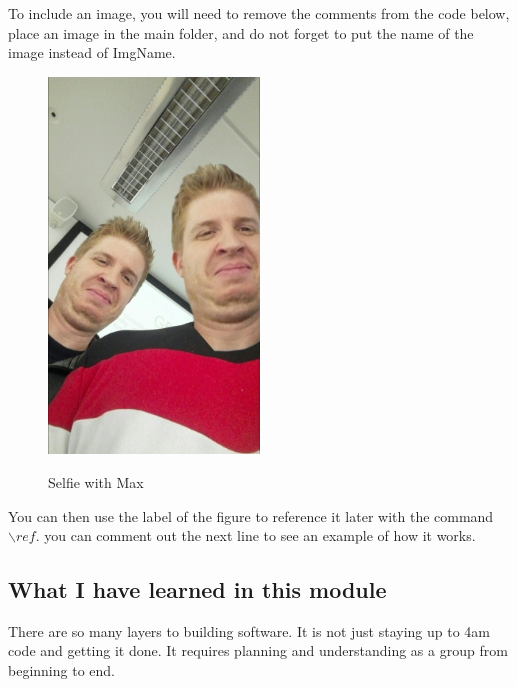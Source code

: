 To include an image, you will need to remove the comments from the code below, place an image in the main folder, and do not forget to put the name of the image instead of ImgName. 

\begin{figure}[h]
\caption{Selfie with Max}
\centering
\includegraphics[width=0.5\textwidth]{af48bcf9-8756-467e-bd54-b3275c9d5df9.jpg}
\label{fig:selfie}
\end{figure}

You can then use the label of the figure to reference it later with the command ${\backslash}ref$. you can comment out the next line to see an example of how it works.


\subsection{What I have learned in this module}
There are so many layers to building software. It is not just staying up to 4am  code and getting it done. It requires planning and understanding as a group from beginning to end.

